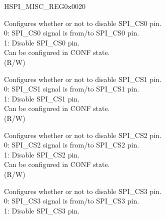 \begin{register}{H}{SPI\_MISC\_REG}{0x0020}\label{regdesc:SPIMISCREG}
%
%
%
%
%
%
%
%
%
%
%
%
%
%
%
%
%
%
%
%
\regnewline%
\begin{regdesc}\begin{reglist}
\label{fielddesc:SPICS0DIS}\item [SPI\_CS0\_DIS] Configures whether or not to disable SPI\_CS0 pin.\\
0: SPI\_CS0 signal is from/to SPI\_CS0 pin.\\
1: Disable SPI\_CS0 pin.\\
Can be configured in CONF state. \\
(R/W)
\label{fielddesc:SPICS1DIS}\item [SPI\_CS1\_DIS] Configures whether or not to disable SPI\_CS1 pin.\\
0: SPI\_CS1 signal is from/to SPI\_CS1 pin.\\
1: Disable SPI\_CS1 pin.\\
Can be configured in CONF state.\\
(R/W)
\label{fielddesc:SPICS2DIS}\item [SPI\_CS2\_DIS] Configures whether or not to disable SPI\_CS2 pin.\\
0: SPI\_CS2 signal is from/to SPI\_CS2 pin.\\
1: Disable SPI\_CS2 pin.\\
Can be configured in CONF state.\\
(R/W)
\label{fielddesc:SPICS3DIS}\item [SPI\_CS3\_DIS] Configures whether or not to disable SPI\_CS3 pin.\\
0: SPI\_CS3 signal is from/to SPI\_CS3 pin.\\
1: Disable SPI\_CS3 pin.\\

\end{reglist}
\end{regdesc}
\end{register}
